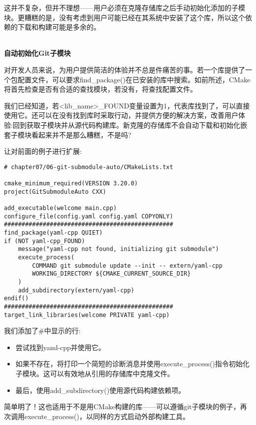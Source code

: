 这并不复杂，但并不理想——用户必须在克隆存储库之后手动初始化添加的子模块。更糟糕的是，没有考虑到用户可能已经在其系统中安装了这个库，所以这个依赖的下载和构建可能是多余的。

\hspace*{\fill} \\ %
\noindent
\textbf{自动初始化Git子模块}

对开发人员来说，为用户提供简洁的体验并不总是件痛苦的事。若一个库提供了一个包配置文件，可以要求find\_package()在已安装的库中搜索。如前所述，CMake将首先检查是否有合适的查找模块，若没有，将查找配置文件。

我们已经知道，若<lib\_name>\_FOUND变量设置为1，代表库找到了，可以直接使用它。还可以在没有找到库时采取行动，并提供方便的解决方案，改善用户体验:回到获取子模块并从源代码构建库。新克隆的存储库不会自动下载和初始化嵌套子模块看起来并不是那么糟糕，不是吗?

让对前面的例子进行扩展:

\begin{lstlisting}[style=styleCMake]
# chapter07/06-git-submodule-auto/CMakeLists.txt

cmake_minimum_required(VERSION 3.20.0)
project(GitSubmoduleAuto CXX)

add_executable(welcome main.cpp)
configure_file(config.yaml config.yaml COPYONLY)
################################################
find_package(yaml-cpp QUIET)
if (NOT yaml-cpp_FOUND)
	message("yaml-cpp not found, initializing git submodule")
	execute_process(
		COMMAND git submodule update --init -- extern/yaml-cpp
		WORKING_DIRECTORY ${CMAKE_CURRENT_SOURCE_DIR}
	)
	add_subdirectory(extern/yaml-cpp)
endif()
################################################
target_link_libraries(welcome PRIVATE yaml-cpp)
\end{lstlisting}

我们添加了\#中显示的行:

\begin{itemize}
\item 
尝试找到yaml-cpp并使用它。

\item 
如果不存在，将打印一个简短的诊断消息并使用execute\_process()指令初始化子模块。这可以有效地从引用的存储库中克隆文件。

\item 
最后，使用add\_subdirectory()使用源代码构建依赖项。
\end{itemize}

简单明了！这也适用于不是用CMake构建的库——可以遵循git子模块的例子，再次调用execute\_process()，以同样的方式启动外部构建工具。

